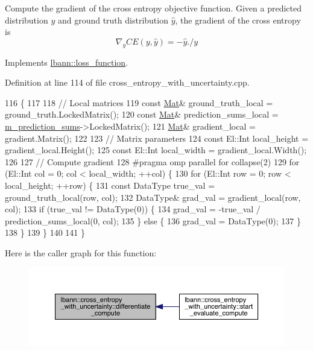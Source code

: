 Compute the gradient of the cross entropy objective function. Given a predicted distribution $y$ and ground truth distribution $\hat{y}$, the gradient of the cross entropy is \[ \nabla_y CE (y,\hat{y}) = - \hat{y} . / y \] 

Implements \hyperlink{classlbann_1_1loss__function_aefccc2b4f5a02664002d12630cf369e7}{lbann\+::loss\+\_\+function}.



Definition at line 114 of file cross\+\_\+entropy\+\_\+with\+\_\+uncertainty.\+cpp.


\begin{DoxyCode}
116                                                                                  \{
117 
118   \textcolor{comment}{// Local matrices}
119   \textcolor{keyword}{const} \hyperlink{base_8hpp_a68f11fdc31b62516cb310831bbe54d73}{Mat}& ground\_truth\_local = ground\_truth.LockedMatrix();
120   \textcolor{keyword}{const} \hyperlink{base_8hpp_a68f11fdc31b62516cb310831bbe54d73}{Mat}& prediction\_sums\_local = \hyperlink{classlbann_1_1cross__entropy__with__uncertainty_a4b45767c526e7ebe4a55ff1a1ddbd7ba}{m\_prediction\_sums}->LockedMatrix();
121   \hyperlink{base_8hpp_a68f11fdc31b62516cb310831bbe54d73}{Mat}& gradient\_local = gradient.Matrix();
122 
123   \textcolor{comment}{// Matrix parameters}
124   \textcolor{keyword}{const} El::Int local\_height = gradient\_local.Height();
125   \textcolor{keyword}{const} El::Int local\_width = gradient\_local.Width();
126 
127   \textcolor{comment}{// Compute gradient}
128 \textcolor{preprocessor}{  #pragma omp parallel for collapse(2)}
129   \textcolor{keywordflow}{for} (El::Int col = 0; col < local\_width; ++col) \{
130     \textcolor{keywordflow}{for} (El::Int row = 0; row < local\_height; ++row) \{
131       \textcolor{keyword}{const} DataType true\_val = ground\_truth\_local(row, col);
132       DataType& grad\_val = gradient\_local(row, col);
133       \textcolor{keywordflow}{if} (true\_val != DataType(0)) \{
134         grad\_val = -true\_val / prediction\_sums\_local(0, col);
135       \} \textcolor{keywordflow}{else} \{
136         grad\_val = DataType(0);
137       \}
138     \}
139   \}
140 
141 \}
\end{DoxyCode}
Here is the caller graph for this function\+:\nopagebreak
\begin{figure}[H]
\begin{center}
\leavevmode
\includegraphics[width=350pt]{classlbann_1_1cross__entropy__with__uncertainty_a48ebe2b7a2193c124df0cd15813835d0_icgraph}
\end{center}
\end{figure}
